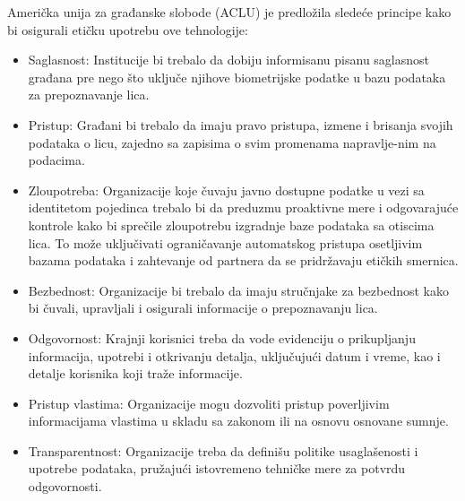 \documentclass{article}
\begin{document}
Američka unija za građanske slobode (ACLU) je predložila sledeće principe kako bi osigurali etičku upotrebu ove tehnologije:
\begin{itemize}
    \item Saglasnost: Institucije bi trebalo da dobiju informisanu pisanu saglasnost građana pre nego što uključe njihove biometrijske podatke u bazu podataka za prepoznavanje lica.
    \item Pristup: Građani bi trebalo da imaju pravo pristupa, izmene i brisanja svojih podataka o licu, zajedno sa zapisima o svim promenama napravlje-nim na podacima.
    \item Zloupotreba: Organizacije koje čuvaju javno dostupne podatke u vezi sa identitetom pojedinca trebalo bi da preduzmu proaktivne mere i odgovarajuće kontrole kako bi sprečile zloupotrebu izgradnje baze podataka sa otiscima lica. To može uključivati ograničavanje automatskog pristupa osetljivim bazama podataka i zahtevanje od partnera da se pridržavaju etičkih smernica.
    \item Bezbednost: Organizacije bi trebalo da imaju stručnjake za bezbednost kako bi čuvali, upravljali i osigurali informacije o prepoznavanju lica.
    \item Odgovornost: Krajnji korisnici treba da vode evidenciju o prikupljanju informacija, upotrebi i otkrivanju detalja, uključujući datum i vreme, kao i detalje korisnika koji traže informacije.
    \item Pristup vlastima: Organizacije mogu dozvoliti pristup poverljivim informacijama vlastima u skladu sa zakonom ili na osnovu osnovane sumnje.
    \item  Transparentnost: Organizacije treba da definišu politike usaglašenosti i upotrebe podataka, pružajući istovremeno tehničke mere za potvrdu odgovornosti. 

\end{itemize}
\newpage
\end{document}
